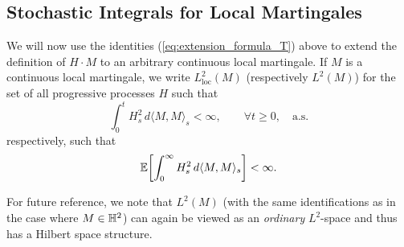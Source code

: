 \documentclass[../Main.tex]{subfiles}
\begin{document}
\subsection{Stochastic Integrals for Local Martingales}

We will now use the identities (\ref{eq:extension_formula_T}) above to extend the definition of $H\cdot M$ to an arbitrary continuous local martingale. If $M$ is a continuous local
martingale, we write $L^2_{\mathrm{loc}}(M)$ (respectively $L^2(M)$) for the set of all progressive processes $H$ such that
$$
\int_0^t H_s^2\,d\langle M,M\rangle_s<\infty,
\qquad \forall t\ge 0,\quad \text{a.s.} $$
respectively, such that
$$
\mathbb{E}\!\left[\int_0^\infty H_s^2\,d\langle M,M\rangle_s\right]<\infty.
$$

For future reference, we note that $L^2(M)$ (with the same identifications
as in the case where $M\in\mathbb{H}^2$) can again be viewed as an
\textit{ordinary} $L^2$-space and thus has a Hilbert space structure.
\end{document}
